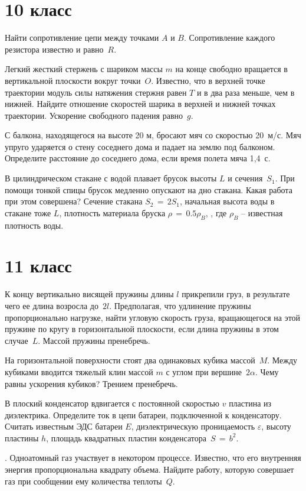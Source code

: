 \section{10 класс}

\AddProb Найти сопротивление цепи между точками $A$ и $B$. Сопротивление каждого резистора известно и равно~$R$.

\AddProb Легкий жесткий стержень с шариком массы $m$ на конце свободно вращается в вертикальной плоскости вокруг точки~$O$. 
Известно, что в верхней точке траектории модуль силы натяжения стержня равен $T$ и в два раза меньше, чем в нижней. 
Найдите отношение скоростей шарика в верхней и нижней точках траектории. Ускорение свободного падения равно~$g$.

\AddProb С балкона, находящегося на высоте 20 м, бросают мяч со скоростью 20~м/с. 
Мяч упруго ударяется о стену соседнего дома и падает на землю под балконом. Определите расстояние до соседнего дома, если время полета мяча 1,4~с.

\AddProb В цилиндрическом стакане с водой плавает брусок высоты $L$ и сечения~$S_1$. 
При помощи тонкой спицы брусок медленно опускают на дно стакана. Какая работа при этом совершена? 
Сечение стакана $S_2\,=\,2S_1$, начальная высота воды в стакане тоже $L$, плотность материала бруска $\rho\,=\,0.5\rho_B$, , где $\rho_B$ -- 
известная плотность воды.



\section{11 класс}

\AddProb К концу вертикально висящей пружины длины $l$ прикрепили груз, в результате чего ее длина возросла до~$2l$. 
Предполагая, что удлинение пружины пропорционально нагрузке, найти угловую скорость груза, 
вращающегося на этой пружине по кругу в горизонтальной плоскости, если длина пружины в этом случае~$L$. Массой пружины пренебречь.

\AddProb На горизонтальной поверхности стоят два одинаковых кубика массой~$M$. 
Между кубиками вводится тяжелый клин массой $m$ с углом при вершине~$2\alpha$. Чему равны ускорения кубиков? Трением пренебречь.

\AddProb В плоский конденсатор вдвигается с постоянной скоростью $v$ пластина из диэлектрика. 
Определите ток в цепи батареи, подключенной к конденсатору. Считать известным ЭДС батареи $E$, диэлектрическую проницаемость {\Large $\varepsilon$}, 
высоту пластины $h$, площадь квадратных пластин конденсатора~$S\,=\,b^2$.

.	Одноатомный газ участвует в некотором процессе. Известно, что его внутренняя энергия пропорциональна квадрату объема. 
Найдите работу, которую совершает газ при сообщении ему количества теплоты~$Q$.
